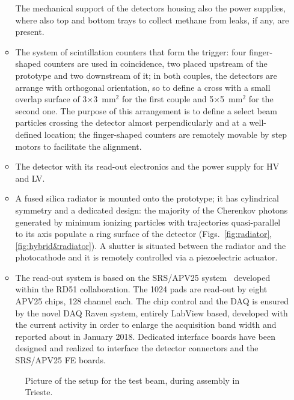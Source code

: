 \begin{enumerate}
\begin{itemize}
	The mechanical support of the detectors housing also the 
	power supplies, where also top
    and bottom trays to collect methane from leaks,
    if any, are present.
    \item The system of scintillation counters that
    form the trigger: four finger-shaped counters
    are used in coincidence, two placed upstream of
    the prototype and two downstream of it; in both
    couples, the detectors are arrange with
    orthogonal orientation, so to define a cross
    with a small overlap surface of
    3$\times$3~mm$^2$ for the first couple and
    5$\times$5~mm$^2$ for the second one. The
    purpose of this arrangement is to define a 
    select beam particles crossing the detector
    almost perpendicularly and at a well-defined
    location; the finger-shaped counters are
    remotely movable by step motors to facilitate
    the alignment.
    \item The detector with its read-out electronics
    and the power supply for HV and LV.
    \item A fused silica radiator is mounted onto
    the prototype; it has cylindrical symmetry
    and a dedicated design: the majority of the Cherenkov photons
    generated by minimum ionizing particles with trajectories quasi-parallel to its axis populate a ring
    surface of the detector
    (Figs.~\ref{fig:radiator}, \ref{fig:hybrid&radiator}). A shutter is situated between the radiator and the photocathode and it is remotely controlled via a piezoelectric actuator.
    \item The read-out system is based on the SRS/APV25 system~\cite{1748-0221-8-03-C03015} developed within the RD51 collaboration. The 1024 pads are read-out by eight APV25 chips, 128 channel each. The chip control and the DAQ is ensured by the novel DAQ Raven system,  entirely
LabView based, developed with the current activity in order  to enlarge the acquisition band width and reported about in January 2018. Dedicated interface boards have been designed and realized to interface the detector connectors and the SRS/APV25 FE boards.
\end{itemize}
\begin{figure}
\begin{center}
\caption{\label{fig:set-up_sketch}
Picture of the setup for the test beam, during assembly in Trieste.
}
\end{center}
\end{figure}

\end{enumerate}

